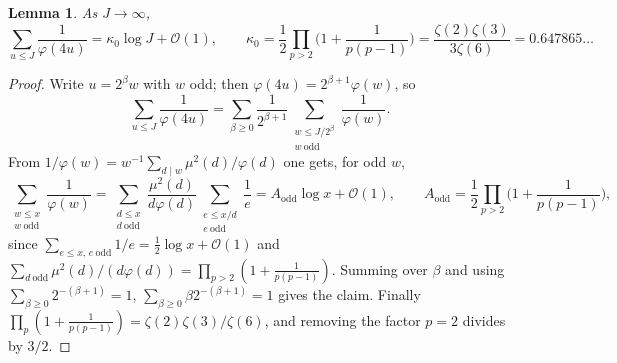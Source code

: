 \documentclass[11pt, a4paper]{article}
\theoremstyle{plain}
\newtheorem{lemma}[theorem]{Lemma}
\theoremstyle{definition}
\begin{document}
\begin{lemma}\label{lem:kappa0}
As $J\to\infty$,
$$\sum_{u\le J}\frac{1}{\varphi(4u)}=\kappa_0\log J+\mathcal{O}(1),\qquad
\kappa_0=\frac12\prod_{p>2}\Big(1+\frac{1}{p(p-1)}\Big)=\frac{\zeta(2)\zeta(3)}{3\zeta(6)}=0.647865\ldots$$
\end{lemma}
\begin{proof}
Write $u=2^{\beta}w$ with $w$ odd; then $\varphi(4u)=2^{\beta+1}\varphi(w)$, so
$$\sum_{u\le J}\frac{1}{\varphi(4u)}=\sum_{\beta\ge0}\frac{1}{2^{\beta+1}}\sum_{\substack{w\le J/2^{\beta}\\ w\ \mathrm{odd}}}\frac{1}{\varphi(w)} .$$
From $1/\varphi(w)=w^{-1}\sum_{d\mid w}\mu^{2}(d)/\varphi(d)$ one gets, for odd $w$,
$$\sum_{\substack{w\le x\\ w\ \mathrm{odd}}}\frac1{\varphi(w)}=\sum_{\substack{d\le x\\ d\ \mathrm{odd}}}\frac{\mu^{2}(d)}{d\varphi(d)}\sum_{\substack{e\le x/d\\ e\ \mathrm{odd}}}\frac1e=A_{\mathrm{odd}}\log x+\mathcal{O}(1),\qquad A_{\mathrm{odd}}=\frac12\prod_{p>2}\Big(1+\frac{1}{p(p-1)}\Big),$$
since $\sum_{e\le x,\,e\ \mathrm{odd}}1/e=\frac12\log x+\mathcal{O}(1)$ and $\sum_{d\ \mathrm{odd}}\mu^{2}(d)/(d\varphi(d))=\prod_{p>2}(1+\frac1{p(p-1)})$. Summing over $\beta$ and using $\sum_{\beta\ge0}2^{-(\beta+1)}=1$, $\sum_{\beta\ge0}\beta2^{-(\beta+1)}=1$ gives the claim. Finally $\prod_{p}(1+\frac1{p(p-1)})=\zeta(2)\zeta(3)/\zeta(6)$, and removing the factor $p=2$ divides by $3/2$.
\end{proof}
\end{document}
